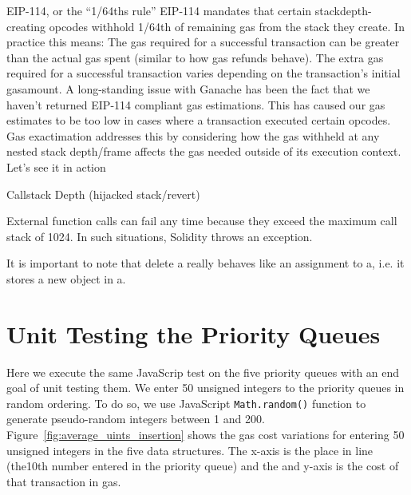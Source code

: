 EIP-114, or the “1/64ths rule”
EIP-114 mandates that certain stackdepth-creating opcodes withhold 1/64th of remaining gas from the stack they create. In practice this means:
The gas required for a successful transaction can be greater than the actual gas spent (similar to how gas refunds behave).
The extra gas required for a successful transaction varies depending on the transaction’s initial gasamount.
A long-standing issue with Ganache has been the fact that we haven’t returned EIP-114 compliant gas estimations. This has caused our gas estimates to be too low in cases where a transaction executed certain opcodes. Gas exactimation addresses this by considering how the gas withheld at any nested stack depth/frame affects the gas needed outside of its execution context.
Let’s see it in action


Callstack Depth (hijacked stack/revert)

External function calls can fail any time because they exceed the maximum call stack of 1024. In such situations, Solidity throws an exception.





It is important to note that delete a really behaves like an assignment to a, i.e. it stores a new object in a.






\section{Unit Testing the Priority Queues}

Here we execute the same JavaScrip test on the five priority queues with an end goal of unit testing them. We enter 50 unsigned integers to the priority queues in random ordering. To do so, we use JavaScript \texttt{Math.random()} function to generate pseudo-random integers between 1 and 200. Figure~\ref{fig:average_uints_insertion} shows the gas cost variations for entering 50 unsigned integers in the five data structures. The x-axis is the place in line (\eg the10th number entered in the priority queue) and the and y-axis is the cost of that transaction in gas. 


